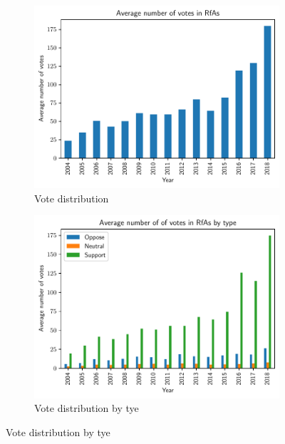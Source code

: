 \begin{figure}[!ht]
    \centering
    \begin{subfigure}{0.49\textwidth}
        \centering
        \includegraphics[width=\textwidth]{images/avg_votes.pdf}
        \caption{Vote distribution}
        \label{fig:vot-distribution}
    \end{subfigure}
    \begin{subfigure}{0.49\textwidth}
        \centering
        \includegraphics[width=\textwidth]{images/avg_votes_type.pdf}
        \caption{Vote distribution by tye }
        \label{fig:vote-type-distribution}
    \end{subfigure}
    

\end{figure}
